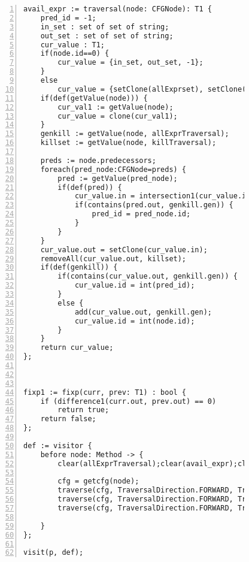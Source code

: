 \begin{figure}[ht!]
\begin{lstlisting}[numbers=left, tabsize=4, escapechar=@, caption={Common subexpression detection},label={lst:csd-code}, lastline = 45]
avail_expr := traversal(node: CFGNode): T1 {
	pred_id = -1;
	in_set : set of set of string;
	out_set : set of set of string;
	cur_value : T1;
	if(node.id==0) {
		cur_value = {in_set, out_set, -1};
	}
	else
		cur_value = {setClone(allExprset), setClone(allExprset), -1};
	if(def(getValue(node))) {
		cur_val1 := getValue(node);
		cur_value = clone(cur_val1);
	}
	genkill := getValue(node, allExprTraversal);
	killset := getValue(node, killTraversal);

	preds := node.predecessors;
	foreach(pred_node:CFGNode=preds) {	
		pred := getValue(pred_node);
		if(def(pred)) {
			cur_value.in = intersection1(cur_value.in, pred.out);
			if(contains(pred.out, genkill.gen)) {
				pred_id = pred_node.id;
			}
		}
	}
	cur_value.out = setClone(cur_value.in);
	removeAll(cur_value.out, killset);
	if(def(genkill)) {
		if(contains(cur_value.out, genkill.gen)) {
			cur_value.id = int(pred_id);
		}
		else {
			add(cur_value.out, genkill.gen);
			cur_value.id = int(node.id);
		}
	}
	return cur_value;
};



fixp1 := fixp(curr, prev: T1) : bool {
	if (difference1(curr.out, prev.out) == 0)
		return true;	
	return false;
};

def := visitor {
	before node: Method -> {
		clear(allExprTraversal);clear(avail_expr);clear(killTraversal);clear(allExprset);

		cfg = getcfg(node);
		traverse(cfg, TraversalDirection.FORWARD, TraversalKind.HYBRID, allExprTraversal);
		traverse(cfg, TraversalDirection.FORWARD, TraversalKind.HYBRID, killTraversal);
		traverse(cfg, TraversalDirection.FORWARD, TraversalKind.HYBRID, avail_expr, fixp1);
			
	}
};

visit(p, def);
\end{lstlisting}
\end{figure}
